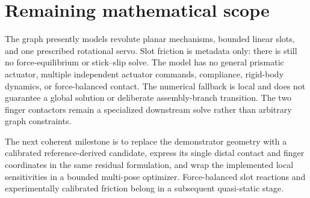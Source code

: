 \documentclass[11pt]{article}
\begin{document}
\section{Remaining mathematical scope}

The graph presently models revolute planar mechanisms, bounded linear slots,
and one prescribed rotational servo. Slot friction is metadata only: there is
still no force-equilibrium or stick--slip solve. The model has no general
prismatic actuator, multiple independent actuator commands, compliance,
rigid-body dynamics, or force-balanced contact.
The numerical fallback is local and does not guarantee a global solution or
deliberate assembly-branch transition. The two finger contactors remain a
specialized downstream solve rather than arbitrary graph constraints.

The next coherent milestone is to replace the demonstrator geometry with a
calibrated reference-derived candidate, express its single distal contact and
finger coordinates in the same residual formulation, and wrap the implemented
local sensitivities in a bounded multi-pose optimizer. Force-balanced slot
reactions and experimentally calibrated friction belong in a subsequent
quasi-static stage.



\end{document}
